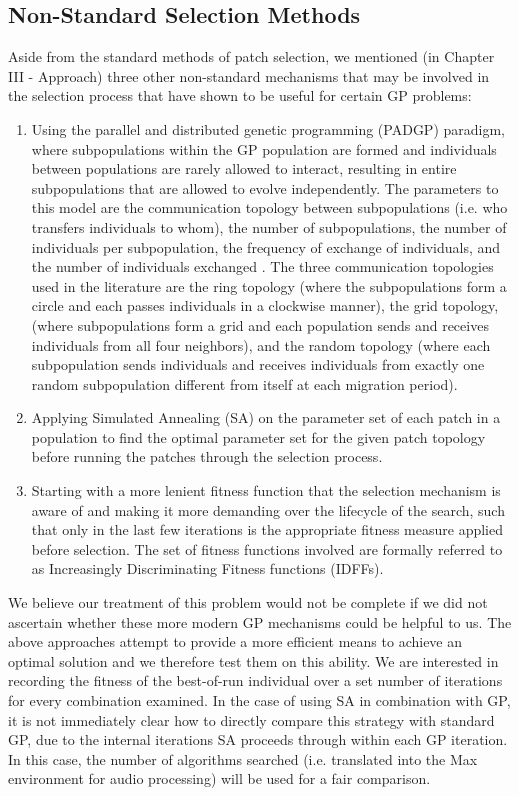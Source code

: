 \documentclass[12pt]{report} 	%
\numberwithin{figure}{chapter}
\numberwithin{table}{chapter}
\numberwithin{equation}{chapter}
\begin{document}
\begin{flushleft}
\vspace{12pt}
\subsection{Non-Standard Selection Methods}

Aside from the standard methods of patch selection, we mentioned (in Chapter III - Approach)  three other non-standard mechanisms that may be involved in the selection process that have shown to be useful for certain GP problems:

\begin{enumerate}
\item Using the parallel and distributed genetic programming (PADGP) paradigm, where subpopulations within the GP population are formed and individuals between populations are rarely allowed to interact, resulting in entire subpopulations that are allowed to evolve independently. The parameters to this model are the communication topology between subpopulations (i.e. who transfers individuals to whom), the number of subpopulations, the number of individuals per subpopulation, the frequency of exchange of individuals, and the number of individuals exchanged \cite[p. 178]{Vanneschi:2004le}. The three communication topologies used in the literature are the ring topology (where the subpopulations form a circle and each passes individuals in a clockwise manner), the grid topology, (where subpopulations form a grid and each population sends and receives individuals from all four neighbors), and the random topology (where each subpopulation sends individuals and receives individuals from exactly one random subpopulation different from itself at each migration period).
\item Applying Simulated Annealing (SA) on the parameter set of each patch in a population to find the optimal parameter set for the given patch topology before running the patches through the selection process.
\item Starting with a more lenient fitness function that the selection mechanism is aware of and making it more demanding over the lifecycle of the search, such that only in the last few iterations is the appropriate fitness measure applied before selection. The set of fitness functions involved are formally referred to as Increasingly Discriminating Fitness functions (IDFFs). 
\end{enumerate}

We believe our treatment of this problem would not be complete if we did not ascertain whether these more modern GP mechanisms could be helpful to us. The above approaches attempt to provide a more efficient means to achieve an optimal solution and we therefore test them on this ability. We are interested in recording the fitness of the best-of-run individual over a set number of iterations for every combination examined. In the case of using SA in combination with GP, it is not immediately clear how to directly compare this strategy with standard GP, due to the internal iterations SA proceeds through within each GP iteration. In this case, the number of algorithms searched (i.e. translated into the Max environment for audio processing) will be used for a fair comparison.


\end{flushleft}
\end{document}
